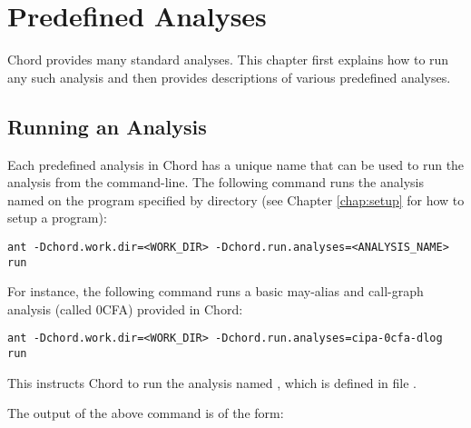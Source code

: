 \chapter{Predefined Analyses}
\label{chap:predefined}

Chord provides many standard analyses.
This chapter first explains how to run any such analysis and then provides
descriptions of various predefined analyses.

\section{Running an Analysis}
\label{sec:running-predefined}

Each predefined analysis in Chord has a unique name that can be used to run the
analysis from the command-line.  The following command runs the analysis named
 on the program specified by directory 
(see Chapter \ref{chap:setup} for how to setup a program):

\begin{framed}
\begin{verbatim}
ant -Dchord.work.dir=<WORK_DIR> -Dchord.run.analyses=<ANALYSIS_NAME> run
\end{verbatim}
\end{framed}

For instance, the following command runs a basic may-alias and call-graph
analysis (called 0CFA) provided in Chord:

\begin{framed}
\begin{verbatim}
ant -Dchord.work.dir=<WORK_DIR> -Dchord.run.analyses=cipa-0cfa-dlog run
\end{verbatim}
\end{framed}

This instructs Chord to run the analysis named ,
which is defined in file .

The output of the above command is of the form:

